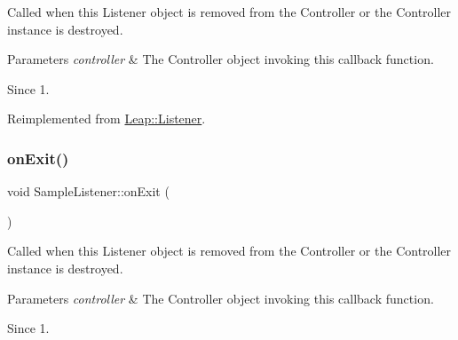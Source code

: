 Called when this Listener object is removed from the Controller or the Controller instance is destroyed.


\begin{DoxyCodeInclude}
\end{DoxyCodeInclude}



\begin{DoxyParams}{Parameters}
{\em controller} & The Controller object invoking this callback function. \\
\hline
\end{DoxyParams}
\begin{DoxySince}{Since}
1. 
\end{DoxySince}


Reimplemented from \hyperlink{class_leap_1_1_listener_ac8f779a9208101f0084953560923f88c}{Leap\+::\+Listener}.

\mbox{\label{class_sample_listener_a60457e8e88223f71c15876f7d27d3bdd}} 
\subsubsection{\texorpdfstring{on\+Exit()}{onExit()}\hspace{0.1cm}{\footnotesize\ttfamily [2/2]}}
{\footnotesize\ttfamily void Sample\+Listener\+::on\+Exit (\begin{DoxyParamCaption}\item[{const \hyperlink{class_leap_1_1_controller}{Controller} \&}]{ }\end{DoxyParamCaption})\hspace{0.3cm}{\ttfamily [virtual]}}

Called when this Listener object is removed from the Controller or the Controller instance is destroyed.


\begin{DoxyCodeInclude}
\end{DoxyCodeInclude}



\begin{DoxyParams}{Parameters}
{\em controller} & The Controller object invoking this callback function. \\
\hline
\end{DoxyParams}
\begin{DoxySince}{Since}
1. 
\end{DoxySince}


